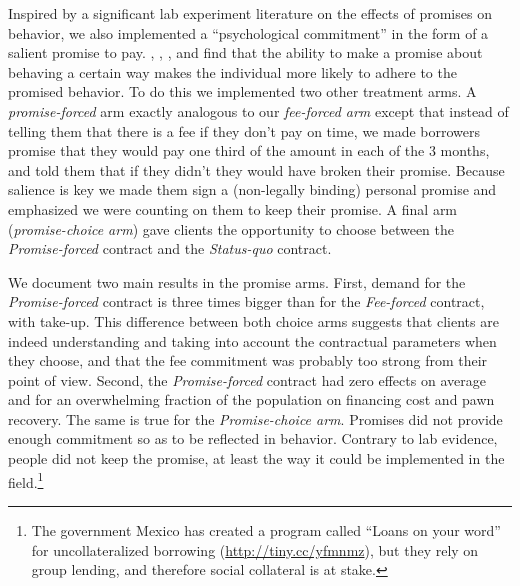 \documentclass[11pt]{article}
\begin{document}
Inspired by a significant lab experiment literature on the effects of promises on behavior, we also implemented a ``psychological commitment'' in the form of a salient promise to pay.  \cite{PromisesPartnerships}, \cite{FurtherPromises}, \cite{Vanberg}, and \cite{Ismayilov2017} find that the ability to make a promise about behaving a certain way makes the individual more likely to adhere to the promised behavior. %
To do this we implemented two other treatment arms. A \textit{promise-forced} arm exactly analogous to our \textit{fee-forced arm} except that instead of telling them that there is a fee if they don't pay on time, we made borrowers promise that they would pay one third of the amount in each of the 3 months, and told them that if they didn't they would have broken their promise. Because salience is key we made them sign a (non-legally binding) personal promise and emphasized we were counting on them to keep their promise. A final arm (\textit{promise-choice arm}) gave clients the opportunity to choose between the \textit{Promise-forced} contract and the \textit{Status-quo} contract.

We document two main results in the promise arms. First, demand for the \textit{Promise-forced} contract is three times bigger than for the \textit{Fee-forced} contract, with  take-up. This difference between both choice arms suggests that clients are indeed understanding and taking into account the contractual parameters when they choose, and that the fee commitment was probably too strong from their point of view. Second, the \textit{Promise-forced} contract had zero effects on average and for an overwhelming fraction of the population on financing cost and pawn recovery. The same is true for the \textit{Promise-choice arm}. %
Promises did not provide enough commitment so as to be reflected in behavior. Contrary to lab evidence, people did not keep the promise, at least the way it could be implemented in the field.\footnote{The government Mexico has created a program called ``Loans on your word'' for uncollateralized borrowing (\url{http://tiny.cc/yfmnmz}), but they rely on group lending, and therefore social collateral is at stake.}

\end{document}
